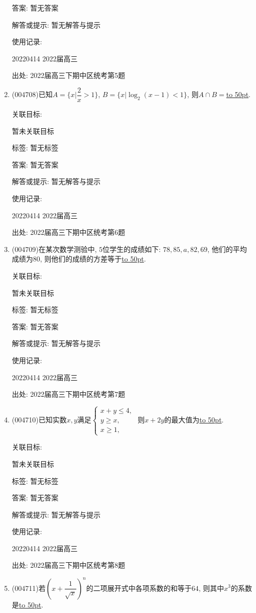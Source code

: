 \documentclass[10pt,a4paper]{article}
\newcommand{\blank}[1]{\underline{\hbox to #1pt{}}}
\begin{document}
\begin{enumerate}[1.]
答案: 暂无答案

解答或提示: 暂无解答与提示

使用记录:

20220414	2022届高三	


出处: 2022届高三下期中区统考第5题
\item { (004708)}已知$A=\{x|\dfrac 2 x>1\}$, $B=\{x|\log_2 (x-1)<1\}$, 则$A\cap B=$\blank{50}.


关联目标:

暂未关联目标



标签: 暂无标签

答案: 暂无答案

解答或提示: 暂无解答与提示

使用记录:

20220414	2022届高三	


出处: 2022届高三下期中区统考第6题
\item { (004709)}在某次数学测验中, $5$位学生的成绩如下: $78,85,a,82,69$, 他们的平均成绩为$80$, 则他们的成绩的方差等于\blank{50}.


关联目标:

暂未关联目标



标签: 暂无标签

答案: 暂无答案

解答或提示: 暂无解答与提示

使用记录:

20220414	2022届高三	


出处: 2022届高三下期中区统考第7题
\item { (004710)}已知实数$x,y$满足$\begin{cases}x+y\le 4, \\ y\ge x, \\ x\ge 1,\end{cases}$ 则$x+2y$的最大值为\blank{50}.


关联目标:

暂未关联目标



标签: 暂无标签

答案: 暂无答案

解答或提示: 暂无解答与提示

使用记录:

20220414	2022届高三	


出处: 2022届高三下期中区统考第8题
\item { (004711)}若$(x+\dfrac 1{\sqrt{x}})^n$的二项展开式中各项系数的和等于$64$, 则其中$x^3$的系数是\blank{50}.



\end{enumerate}
\end{document}
